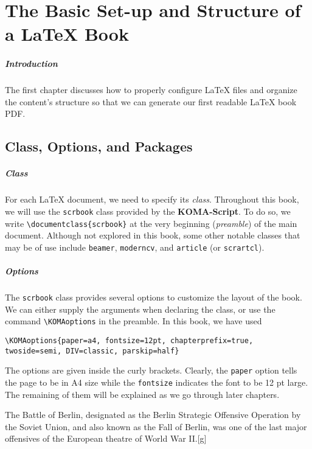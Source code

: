\chapter{The Basic Set-up and Structure of a \LaTeX{} Book}

\paragraph{Introduction}
The first chapter discusses how to properly configure \LaTeX{} files and organize the content's structure so that we can generate our first readable \LaTeX{} book PDF. 

\section{Class, Options, and Packages}

\paragraph{Class}
For each \LaTeX{} document, we need to specify its \textit{class}. Throughout this book, we will use the \verb|scrbook| class provided by the \textbf{KOMA-Script}. To do so, we write \texttt{\textbackslash documentclass\{scrbook\}} at the very beginning (\textit{preamble}) of the main document. Although not explored in this book, some other notable classes that may be of use include \verb|beamer|, \verb|moderncv|, and \verb|article| (or \verb|scrartcl|).

\paragraph{Options} The \verb|scrbook| class provides several options to customize the layout of the book. We can either supply the arguments when declaring the class, or use the command \texttt{\textbackslash KOMAoptions} in the preamble. In this book, we have used
\begin{lstlisting}
\KOMAoptions{paper=a4, fontsize=12pt, chapterprefix=true, twoside=semi, DIV=classic, parskip=half}
\end{lstlisting}
The options are given inside the curly brackets. Clearly, the \verb|paper| option tells the page to be in A4 size while the \verb|fontsize| indicates the font to be 12 pt large. The remaining of them will be explained as we go through later chapters.

The Battle of Berlin, designated as the Berlin Strategic Offensive Operation by the Soviet Union, and also known as the Fall of Berlin, was one of the last major offensives of the European theatre of World War II.[g]


